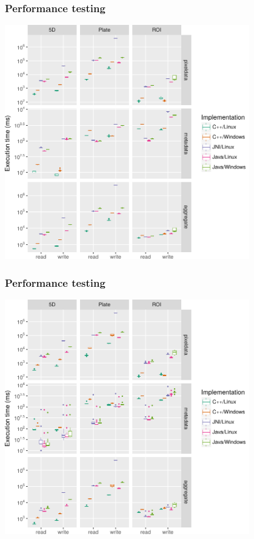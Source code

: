 \documentclass{beamer}
\begin{document}
\begin{frame}[fragile]
  \frametitle{Performance testing}
  \begin{centering}
    \includegraphics[width=0.8\textwidth]{cpp-dundee-2017-figures/files-suppfig5}
  \end{centering}
\end{frame}

\begin{frame}[fragile]
  \frametitle{Performance testing}
  \begin{centering}
    \includegraphics[width=0.8\textwidth]{cpp-dundee-2017-figures/files-suppfig6}
  \end{centering}
\end{frame}
\end{document}
